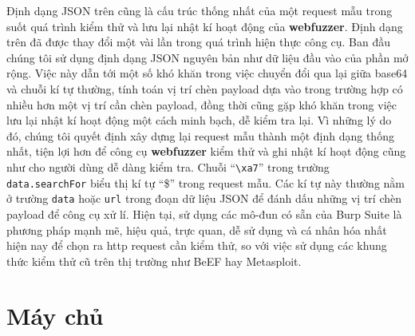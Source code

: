 Định dạng JSON trên cũng là cấu trúc thống nhất của một request mẫu trong suốt quá trình kiểm thử và lưu lại nhật kí hoạt động của \textbf{webfuzzer}. Định dạng trên đã được thay đổi một vài lần trong quá trình hiện thực công cụ. Ban đầu chúng tôi sử dụng định dạng JSON nguyên bản như dữ liệu đầu vào của phần mở rộng. Việc này dẫn tới một số khó khăn trong việc chuyển đổi qua lại giữa base64 và chuỗi kí tự thường, tính toán vị trí chèn payload dựa vào trong trường hợp có nhiều hơn một vị trí cần chèn payload, đồng thời cũng gặp khó khăn trong việc lưu lại nhật kí hoạt động một cách minh bạch, dễ kiểm tra lại. Vì những lý do đó, chúng tôi quyết định xây dựng lại request mẫu thành một định dạng thống nhất, tiện lợi hơn để công cụ \textbf{webfuzzer} kiểm thử và ghi nhật kí hoạt động cũng như cho người dùng dễ dàng kiểm tra. Chuỗi ``\texttt{\textbackslash xa7}'' trong trường \texttt{data.searchFor} biểu thị kí tự ``\$'' trong request mẫu. Các kí tự này thường nằm ở trường \texttt{data} hoặc \texttt{url} trong đoạn dữ liệu JSON để đánh dấu những vị trí chèn payload để công cụ xử lí. Hiện tại, sử dụng các mô-đun có sẵn của Burp Suite là phương pháp mạnh mẽ, hiệu quả, trực quan, dễ sử dụng và cá nhân hóa nhất hiện nay để chọn ra \acrshort{http} request cần kiểm thử, so với việc sử dụng các khung thức kiểm thử cũ trên thị trường như BeEF hay Metasploit. 

\section{Máy chủ}

